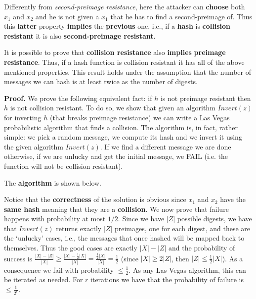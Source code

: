 Differently from \textit{second-preimage resistance}, here the attacker can \textbf{choose} both $x_1$ and $x_2$ and he is not given a $x_1$ that he has to find a second-preimage of. Thus this \textbf{latter} property \textbf{implies} the \textbf{previous} one, i.e., if a \textbf{hash} is \textbf{collision resistant} it is also \textbf{second-preimage resistant}.

It is possible to prove that \textbf{collision resistance} also \textbf{implies} \textbf{preimage resistance}. Thus, if a hash function is collision resistant it has all of the above mentioned properties. This result holds under the assumption that the number of messages we can hash is at least twice as the number of digests.


\textbf{Proof.} We prove the following equivalent fact: if $h$ is not preimage resistant then $h$ is not collision resistant. To do so, we show that given an algorithm $Invert(z)$ for inverting $h$ (that breaks preimage resistance) we can write a Las Vegas probabilistic algorithm that finds a collision. The algorithm is, in fact, rather simple: we pick a random message, we compute its hash and we invert it using the given algorithm $Invert(z)$. If we find a different message we are done otherwise, if we are unlucky and get the initial message, we FAIL (i.e. the function will not be collision resistant).

The \textbf{algorithm} is shown below. 


Notice that the \textbf{correctness} of the solution is obvious since $x_1$ and $x_2$ have the \textbf{same hash} meaning that they are a \textbf{collision}. We now prove that failure happens with probability at most $1/2$. Since we have $|Z|$ possible digests, we have that $Invert(z)$ returns exactly $|Z|$ preimages, one for each digest, and these are the ‘unlucky’ cases, i.e., the messages that once hashed will be mapped back to themselves. Thus the good cases are exactly $|X|-|Z|$ and the probability of success is $\frac{|X|-|Z|}{|X|}  \geq \frac{|X| - \frac{1}{2}|X|}{|X|} = \frac{\frac{1}{2}|X|}{|X|} = \frac{1}{2}$ (since $|X| \geq 2|Z|$, then $|Z| \leq \frac{1}{2}|X|$). As a consequence we fail with probability $\leq \frac{1}{2}$. As any Las Vegas algorithm, this can be iterated as needed. For $r$ iterations we have that the probability of failure is $\leq \frac{1}{2^r}$.

